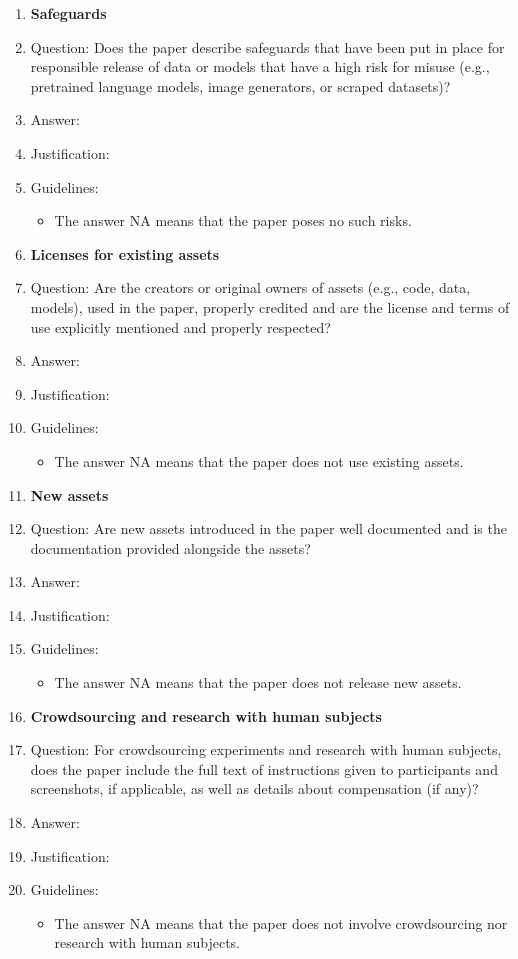 \documentclass{article}
\begin{document}
\begin{enumerate}
\item {\bf Safeguards}
    \item[] Question: Does the paper describe safeguards that have been put in place for responsible release of data or models that have a high risk for misuse (e.g., pretrained language models, image generators, or scraped datasets)?
    \item[] Answer: \answerTODO{}
    \item[] Justification: \justificationTODO{}
    \item[] Guidelines:
    \begin{itemize}
        \item The answer NA means that the paper poses no such risks.
    \end{itemize}

\item {\bf Licenses for existing assets}
    \item[] Question: Are the creators or original owners of assets (e.g., code, data, models), used in the paper, properly credited and are the license and terms of use explicitly mentioned and properly respected?
    \item[] Answer: \answerTODO{}
    \item[] Justification: \justificationTODO{}
    \item[] Guidelines:
    \begin{itemize}
        \item The answer NA means that the paper does not use existing assets.
    \end{itemize}

\item {\bf New assets}
    \item[] Question: Are new assets introduced in the paper well documented and is the documentation provided alongside the assets?
    \item[] Answer: \answerTODO{}
    \item[] Justification: \justificationTODO{}
    \item[] Guidelines:
    \begin{itemize}
        \item The answer NA means that the paper does not release new assets.
    \end{itemize}

\item {\bf Crowdsourcing and research with human subjects}
    \item[] Question: For crowdsourcing experiments and research with human subjects, does the paper include the full text of instructions given to participants and screenshots, if applicable, as well as details about compensation (if any)?
    \item[] Answer: \answerTODO{}
    \item[] Justification: \justificationTODO{}
    \item[] Guidelines:
    \begin{itemize}
        \item The answer NA means that the paper does not involve crowdsourcing nor research with human subjects.
    \end{itemize}


\end{enumerate}
\end{document}
